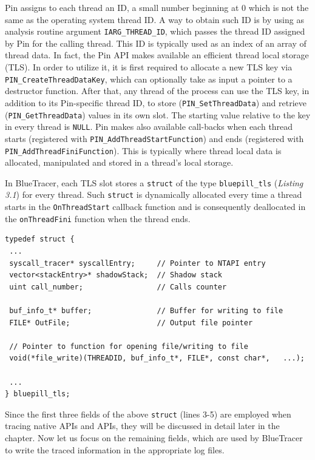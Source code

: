 Pin assigns to each thread an ID, a small number beginning at 0
which is not the same as the operating system thread ID. A way to obtain such ID is by using as analysis routine argument \texttt{IARG\_THREAD\_ID}, which passes the thread ID assigned by Pin for the calling thread. This ID is typically used as an index of an array of thread data.
In fact, the Pin API makes available an efficient thread local storage (TLS). In order to utilize it, it is first required to allocate a new TLS key via \texttt{PIN\_CreateThreadDataKey}, which can optionally take as input a pointer to a destructor function. After that, any thread of the process can use the TLS key, in addition to its Pin-specific thread ID, to store (\texttt{PIN\_SetThreadData}) and retrieve (\texttt{PIN\_GetThreadData}) values in its own slot. The starting value relative to the key in every thread is \texttt{NULL}.
Pin makes also available call-backs when each thread starts (registered with \texttt{PIN\_AddThreadStartFunction}) and ends (registered with \texttt{PIN\_AddThreadFiniFunction}). This is typically where thread local data is allocated, manipulated and stored in a thread's local storage\cite{Pin}.

In BlueTracer, each TLS slot stores a \texttt{struct} of the type \texttt{bluepill\_tls} (\textit{Listing 3.1}) for every thread. Such \texttt{struct} is dynamically allocated every time a thread starts in the \texttt{OnThreadStart} callback function and is consequently deallocated in the \texttt{onThreadFini} function when the thread ends.

\vspace{0.5cm}
\begin{lstlisting}[caption={Thread Local Data},captionpos=b]
typedef struct {
 ...
 syscall_tracer* syscallEntry;     // Pointer to NTAPI entry
 vector<stackEntry>* shadowStack;  // Shadow stack
 uint call_number;             	   // Calls counter							
 
 buf_info_t* buffer;		   	   // Buffer for writing to file				 
 FILE* OutFile;                    // Output file pointer
 
 // Pointer to function for opening file/writing to file	
 void(*file_write)(THREADID, buf_info_t*, FILE*, const char*, 	...);
 
 ...
} bluepill_tls;
\end{lstlisting}

Since the first three fields of the above \texttt{struct} (lines 3-5) are employed when tracing native APIs and APIs, they will be discussed in detail later in the chapter. Now let us focus on the remaining fields, which are used by BlueTracer to write the traced information in the appropriate log files. 

